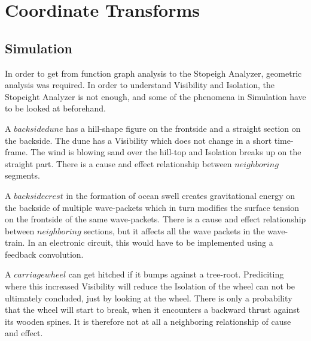 \documentclass{report}
\begin{document}
\chapter{Coordinate Transforms}

\section{Simulation}
In order to get from function graph analysis to the Stopeigh Analyzer, geometric analysis was required. In order to understand Visibility and Isolation, the Stopeight Analyzer is not enough, and some of the phenomena in Simulation have to be looked at beforehand.

A $backside dune$ has a hill-shape figure on the frontside and a straight section on the backside. The dune has a Visibility which does not change in a short time-frame. The wind is blowing sand over the hill-top and Isolation breaks up on the straight part. There is a cause and effect relationship between $neighboring$ segments.

A $backside crest$ in the formation of ocean swell creates gravitational energy on the backside of multiple wave-packets which in turn modifies the surface tension on the frontside of the same wave-packets. There is a cause and effect relationship between $neighboring$ sections, but it affects all the wave packets in the wave-train. In an electronic circuit, this would have to be implemented using a feedback convolution.

A $carriage wheel$ can get hitched if it bumps against a tree-root. Prediciting where this increased Visibility will reduce the Isolation of the wheel can not be ultimately concluded, just by looking at the wheel. There is only a probability that the wheel will start to break, when it encounters a backward thrust against its wooden spines. It is therefore not at all a neighboring relationship of cause and effect.
\end{document}
